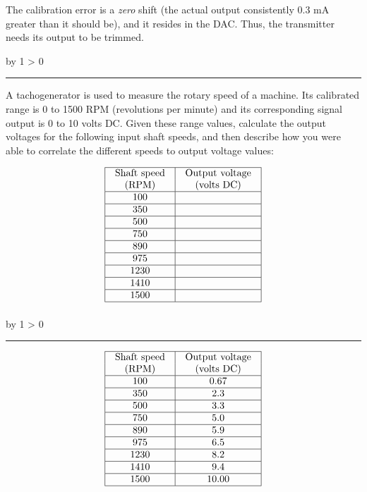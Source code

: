 \documentclass[12pt,a4paper]{article}
\def\oppgave{
            \advance\questnum by 1
            \ifnum \questnum > 0
                 \hrule
                 \vskip 3pt
                 \leftline{Oppgave \the\questnum}
                 \vskip 3pt \fi}
\def\svar{
           \advance\answnum by 1
           \ifnum \answnum > 0
                \hrule
                \vskip 3pt
                \leftline{Svar \the\answnum}
                \vskip 3pt \fi}
\begin{document}
The calibration error is a {\it zero} shift (the actual output consistently 0.3 mA greater than it should be), and it resides in the DAC.  Thus, the transmitter needs its output to be trimmed.


\vfil \eject 



\oppgave{} 

A tachogenerator is used to measure the rotary speed of a machine.  Its calibrated range is 0 to 1500 RPM (revolutions per minute) and its corresponding signal output is 0 to 10 volts DC.  Given these range values, calculate the output voltages for the following input shaft speeds, and then describe how you were able to correlate the different speeds to output voltage values:


$$\vbox{\offinterlineskip
\halign{\strut
\vrule \quad\hfil # \ \hfil & 
\vrule \quad\hfil # \ \hfil \vrule \cr
\noalign{\hrule}
%
Shaft speed & Output voltage \cr
%
(RPM) & (volts DC) \cr
%
\noalign{\hrule}
%
100 &  \cr
%
\noalign{\hrule}
%
350 &  \cr
%
\noalign{\hrule}
%
500 &  \cr
%
\noalign{\hrule}
%
750 &  \cr
%
\noalign{\hrule}
%
890 &  \cr
%
\noalign{\hrule}
%
975 &  \cr
%
\noalign{\hrule}
%
1230 &  \cr
%
\noalign{\hrule}
%
1410 &  \cr
%
\noalign{\hrule}
%
1500 &  \cr
%
\noalign{\hrule}
} %
}$$ %

\vskip 10pt \filbreak 





\svar{} 


$$\vbox{\offinterlineskip
\halign{\strut
\vrule \quad\hfil # \ \hfil & 
\vrule \quad\hfil # \ \hfil \vrule \cr
\noalign{\hrule}
%
Shaft speed & Output voltage \cr
%
(RPM) & (volts DC) \cr
%
\noalign{\hrule}
%
100 & 0.67 \cr
%
\noalign{\hrule}
%
350 & 2.3 \cr
%
\noalign{\hrule}
%
500 & 3.3 \cr
%
\noalign{\hrule}
%
750 & 5.0 \cr
%
\noalign{\hrule}
%
890 & 5.9 \cr
%
\noalign{\hrule}
%
975 & 6.5 \cr
%
\noalign{\hrule}
%
1230 & 8.2 \cr
%
\noalign{\hrule}
%
1410 & 9.4 \cr
%
\noalign{\hrule}
%
1500 & 10.00 \cr
%
\noalign{\hrule}
} %
}$$ %
\end{document}
